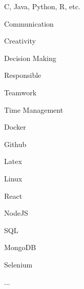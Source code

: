 \begin{cventries}
    \cventry
    {
    	\begin{cvitems}
    		C, Java, Python, R, etc.
    	\end{cvitems}
    }
        {}
   		{}
   		{}
   		{}
        
\end{cventries}
\begin{cventries}
    \cventry
        {}
        {}
        {}
        {}
        {
            \begin{cvitems}
                \item Communication
                \item Creativity
                \item Decision Making
                \item Responsible
                \item Teamwork
                \item Time Management
            \end{cvitems}
        }
\end{cventries}
\begin{cventries}
    \cventry
        {}
        {}
        {}
        {}
        {
            \begin{cvitems}
                \item Docker
                \item Github
                \item Latex
                \item Linux
                \item React
                \item NodeJS
                \item SQL
                \item MongoDB
                \item Selenium
                \item ...
            \end{cvitems}
        }
\end{cventries}
